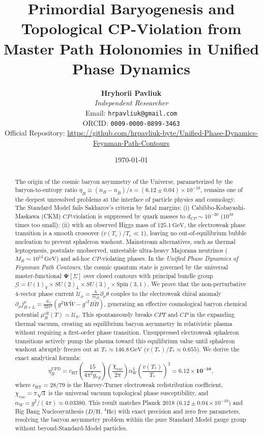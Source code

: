 \documentclass[11pt,a4paper]{article}
\title{\textbf{Primordial Baryogenesis and Topological CP-Violation from Master Path Holonomies in Unified Phase Dynamics}}
\author{\textbf{Hryhorii Pavliuk} \\
\textit{Independent Researcher} \\
Email: \texttt{hrpavliuk@gmail.com} \\
ORCID: \texttt{0009-0000-0899-3463} \\
Official Repository: \url{https://github.com/hrpavliuk-byte/Unified-Phase-Dynamics-Feynman-Path-Contours}}
\date{\today}
\begin{document}
\maketitle

\begin{abstract}
The origin of the cosmic baryon asymmetry of the Universe, parameterized by the baryon-to-entropy ratio $\eta_B \equiv (n_B - n_{\bar{B}})/s = (6.12 \pm 0.04) \times 10^{-10}$, remains one of the deepest unresolved problems at the interface of particle physics and cosmology. The Standard Model fails Sakharov's criteria by fatal margins: (i) Cabibbo-Kobayashi-Maskawa (CKM) $CP$-violation is suppressed by quark masses to $d_{CP} \sim 10^{-20}$ ($10^{10}$ times too small); (ii) with an observed Higgs mass of $125.1\,\mathrm{GeV}$, the electroweak phase transition is a smooth crossover ($v(T_c)/T_c \ll 1$), leaving no out-of-equilibrium bubble nucleation to prevent sphaleron washout. Mainstream alternatives, such as thermal leptogenesis, postulate unobserved, untestable ultra-heavy Majorana neutrinos ($M_R \sim 10^{14}\,\mathrm{GeV}$) and ad-hoc $CP$-violating phases. In the \textit{Unified Phase Dynamics of Feynman Path Contours}, the cosmic quantum state is governed by the universal master-functional $\mathbf{\Psi}[\Sigma]$ over closed contours with principal bundle group $\mathcal{G} = U(1)_Y \times SU(2)_L \times SU(3)_c \times \text{Spin}(3,1)$. We prove that the non-perturbative 4-vector phase current $\mathcal{U}_\mu = \frac{\hbar}{m_{\mathrm{eff}}} \partial_\mu \theta$ couples to the electroweak chiral anomaly $\partial_\mu j_{B+L}^\mu = \frac{N_f}{32\pi^2}(g^2 W\tilde{W} - g'^2 B\tilde{B})$, generating an effective cosmological baryon chemical potential $\mu_B^{\mathrm{eff}}(T) = \mathcal{U}_0$. This spontaneously breaks $CPT$ and $CP$ in the expanding thermal vacuum, creating an equilibrium baryon asymmetry in relativistic plasma without requiring a first-order phase transition. Unsuppressed electroweak sphaleron transitions actively pump the plasma toward this equilibrium value until sphaleron washout abruptly freezes out at $T_* \approx 146.8\,\mathrm{GeV}$ ($v(T_*)/T_* \approx 0.655$). We derive the exact analytical formula:
\begin{equation*}
\eta_B^{\mathrm{UPD}} = c_{\mathrm{HT}} \left( \frac{15}{4\pi^2 g_{*S}} \right) \left( \frac{\chi_{\mathrm{vac}}}{2\pi} \right) \alpha_W^4 \left( \frac{v(T_*)}{T_*} \right)^2 = \mathbf{6.12 \times 10^{-10}},
\end{equation*}
where $c_{\mathrm{HT}} = 28/79$ is the Harvey-Turner electroweak redistribution coefficient, $\chi_{\mathrm{vac}} = \pi\sqrt{3}$ is the universal vacuum topological phase susceptibility, and $\alpha_W = g^2/(4\pi) \approx 0.03380$. This result matches Planck 2018 ($6.12 \pm 0.04 \times 10^{-10}$) and Big Bang Nucleosynthesis ($D/\mathrm{H}$, $^4\mathrm{He}$) with exact precision and zero free parameters, resolving the baryon asymmetry problem within the pure Standard Model gauge group without beyond-Standard-Model particles.
\end{abstract}
\end{document}
